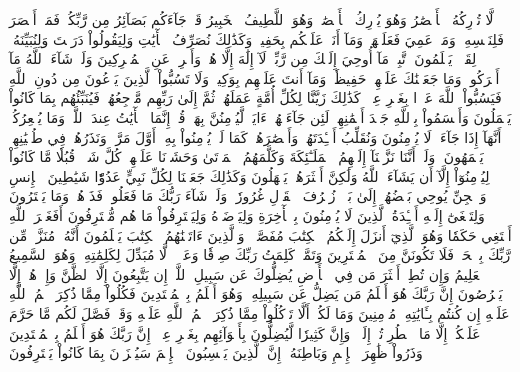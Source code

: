 لَّا تُدۡرِكُهُ ٱلۡأَبۡصَٰرُ وَهُوَ يُدۡرِكُ ٱلۡأَبۡصَٰرَۖ وَهُوَ ٱللَّطِيفُ ٱلۡخَبِيرُ
قَدۡ جَآءَكُم بَصَآئِرُ مِن رَّبِّكُمۡۖ فَمَنۡ أَبۡصَرَ فَلِنَفۡسِهِۦۖ وَمَنۡ عَمِيَ فَعَلَيۡهَاۚ وَمَآ أَنَا۠ عَلَيۡكُم بِحَفِيظٖ
وَكَذَٰلِكَ نُصَرِّفُ ٱلۡأٓيَٰتِ وَلِيَقُولُواْ دَرَسۡتَ وَلِنُبَيِّنَهُۥ لِقَوۡمٖ يَعۡلَمُونَ
ٱتَّبِعۡ مَآ أُوحِيَ إِلَيۡكَ مِن رَّبِّكَۖ لَآ إِلَٰهَ إِلَّا هُوَۖ وَأَعۡرِضۡ عَنِ ٱلۡمُشۡرِكِينَ
وَلَوۡ شَآءَ ٱللَّهُ مَآ أَشۡرَكُواْۗ وَمَا جَعَلۡنَٰكَ عَلَيۡهِمۡ حَفِيظٗاۖ وَمَآ أَنتَ عَلَيۡهِم بِوَكِيلٖ
وَلَا تَسُبُّواْ ٱلَّذِينَ يَدۡعُونَ مِن دُونِ ٱللَّهِ فَيَسُبُّواْ ٱللَّهَ عَدۡوَۢا بِغَيۡرِ عِلۡمٖۗ كَذَٰلِكَ زَيَّنَّا لِكُلِّ أُمَّةٍ عَمَلَهُمۡ ثُمَّ إِلَىٰ رَبِّهِم مَّرۡجِعُهُمۡ فَيُنَبِّئُهُم بِمَا كَانُواْ يَعۡمَلُونَ
وَأَقۡسَمُواْ بِٱللَّهِ جَهۡدَ أَيۡمَٰنِهِمۡ لَئِن جَآءَتۡهُمۡ ءَايَةٞ لَّيُؤۡمِنُنَّ بِهَاۚ قُلۡ إِنَّمَا ٱلۡأٓيَٰتُ عِندَ ٱللَّهِۖ وَمَا يُشۡعِرُكُمۡ أَنَّهَآ إِذَا جَآءَتۡ لَا يُؤۡمِنُونَ
وَنُقَلِّبُ أَفۡـِٔدَتَهُمۡ وَأَبۡصَٰرَهُمۡ كَمَا لَمۡ يُؤۡمِنُواْ بِهِۦٓ أَوَّلَ مَرَّةٖ وَنَذَرُهُمۡ فِي طُغۡيَٰنِهِمۡ يَعۡمَهُونَ
۞وَلَوۡ أَنَّنَا نَزَّلۡنَآ إِلَيۡهِمُ ٱلۡمَلَـٰٓئِكَةَ وَكَلَّمَهُمُ ٱلۡمَوۡتَىٰ وَحَشَرۡنَا عَلَيۡهِمۡ كُلَّ شَيۡءٖ قُبُلٗا مَّا كَانُواْ لِيُؤۡمِنُوٓاْ إِلَّآ أَن يَشَآءَ ٱللَّهُ وَلَٰكِنَّ أَكۡثَرَهُمۡ يَجۡهَلُونَ
وَكَذَٰلِكَ جَعَلۡنَا لِكُلِّ نَبِيٍّ عَدُوّٗا شَيَٰطِينَ ٱلۡإِنسِ وَٱلۡجِنِّ يُوحِي بَعۡضُهُمۡ إِلَىٰ بَعۡضٖ زُخۡرُفَ ٱلۡقَوۡلِ غُرُورٗاۚ وَلَوۡ شَآءَ رَبُّكَ مَا فَعَلُوهُۖ فَذَرۡهُمۡ وَمَا يَفۡتَرُونَ
وَلِتَصۡغَىٰٓ إِلَيۡهِ أَفۡـِٔدَةُ ٱلَّذِينَ لَا يُؤۡمِنُونَ بِٱلۡأٓخِرَةِ وَلِيَرۡضَوۡهُ وَلِيَقۡتَرِفُواْ مَا هُم مُّقۡتَرِفُونَ
أَفَغَيۡرَ ٱللَّهِ أَبۡتَغِي حَكَمٗا وَهُوَ ٱلَّذِيٓ أَنزَلَ إِلَيۡكُمُ ٱلۡكِتَٰبَ مُفَصَّلٗاۚ وَٱلَّذِينَ ءَاتَيۡنَٰهُمُ ٱلۡكِتَٰبَ يَعۡلَمُونَ أَنَّهُۥ مُنَزَّلٞ مِّن رَّبِّكَ بِٱلۡحَقِّۖ فَلَا تَكُونَنَّ مِنَ ٱلۡمُمۡتَرِينَ
وَتَمَّتۡ كَلِمَتُ رَبِّكَ صِدۡقٗا وَعَدۡلٗاۚ لَّا مُبَدِّلَ لِكَلِمَٰتِهِۦۚ وَهُوَ ٱلسَّمِيعُ ٱلۡعَلِيمُ
وَإِن تُطِعۡ أَكۡثَرَ مَن فِي ٱلۡأَرۡضِ يُضِلُّوكَ عَن سَبِيلِ ٱللَّهِۚ إِن يَتَّبِعُونَ إِلَّا ٱلظَّنَّ وَإِنۡ هُمۡ إِلَّا يَخۡرُصُونَ
إِنَّ رَبَّكَ هُوَ أَعۡلَمُ مَن يَضِلُّ عَن سَبِيلِهِۦۖ وَهُوَ أَعۡلَمُ بِٱلۡمُهۡتَدِينَ
فَكُلُواْ مِمَّا ذُكِرَ ٱسۡمُ ٱللَّهِ عَلَيۡهِ إِن كُنتُم بِـَٔايَٰتِهِۦ مُؤۡمِنِينَ
وَمَا لَكُمۡ أَلَّا تَأۡكُلُواْ مِمَّا ذُكِرَ ٱسۡمُ ٱللَّهِ عَلَيۡهِ وَقَدۡ فَصَّلَ لَكُم مَّا حَرَّمَ عَلَيۡكُمۡ إِلَّا مَا ٱضۡطُرِرۡتُمۡ إِلَيۡهِۗ وَإِنَّ كَثِيرٗا لَّيُضِلُّونَ بِأَهۡوَآئِهِم بِغَيۡرِ عِلۡمٍۚ إِنَّ رَبَّكَ هُوَ أَعۡلَمُ بِٱلۡمُعۡتَدِينَ
وَذَرُواْ ظَٰهِرَ ٱلۡإِثۡمِ وَبَاطِنَهُۥٓۚ إِنَّ ٱلَّذِينَ يَكۡسِبُونَ ٱلۡإِثۡمَ سَيُجۡزَوۡنَ بِمَا كَانُواْ يَقۡتَرِفُونَ
